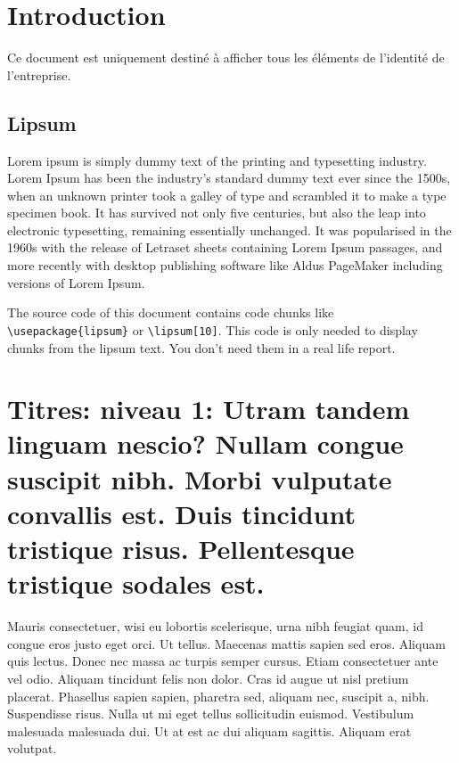 \documentclass[twoside]{extreport}
\begin{document}
\eenglish


\clearpage

{}
\setcounter{tocdepth}{4}
\tableofcontents

  


\clearpage


\hypertarget{introduction}{%
\chapter{Introduction}\label{introduction}}

Ce document est uniquement destiné à afficher tous les éléments de
l'identité de l'entreprise.

\hypertarget{lipsum}{%
\section{Lipsum}\label{lipsum}}

Lorem ipsum is simply dummy text of the printing and typesetting
industry. Lorem Ipsum has been the industry's standard dummy text ever
since the 1500s, when an unknown printer took a galley of type and
scrambled it to make a type specimen book. It has survived not only five
centuries, but also the leap into electronic typesetting, remaining
essentially unchanged. It was popularised in the 1960s with the release
of Letraset sheets containing Lorem Ipsum passages, and more recently
with desktop publishing software like Aldus PageMaker including versions
of Lorem Ipsum.

The source code of this document contains code chunks like
\texttt{\textbackslash{}usepackage\{lipsum\}} or
\texttt{\textbackslash{}lipsum{[}10{]}}. This code is only needed to
display chunks from the lipsum text. You don't need them in a real life
report.

\hypertarget{h:koppen}{%
\chapter{Titres: niveau 1: Utram tandem linguam nescio? Nullam congue
suscipit nibh. Morbi vulputate convallis est. Duis tincidunt tristique
risus. Pellentesque tristique sodales est.}\label{h:koppen}}

Mauris consectetuer, wisi eu lobortis scelerisque, urna nibh feugiat
quam, id congue eros justo eget orci. Ut tellus. Maecenas mattis sapien
sed eros. Aliquam quis lectus. Donec nec massa ac turpis semper cursus.
Etiam consectetuer ante vel odio. Aliquam tincidunt felis non dolor.
Cras id augue ut nisl pretium placerat. Phasellus sapien sapien,
pharetra sed, aliquam nec, suscipit a, nibh. Suspendisse risus. Nulla ut
mi eget tellus sollicitudin euismod. Vestibulum malesuada malesuada dui.
Ut at est ac dui aliquam sagittis. Aliquam erat volutpat.
\end{document}

